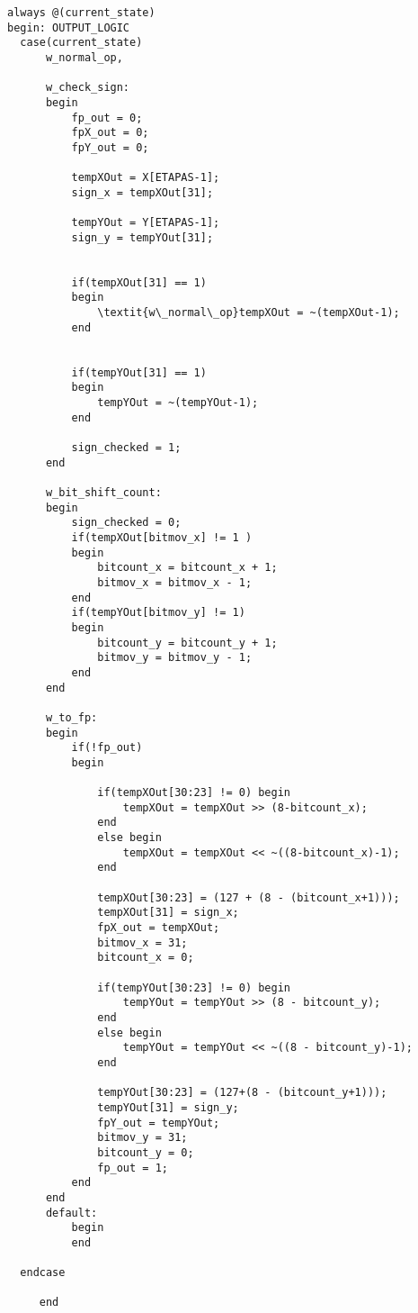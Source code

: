 \begin{lstlisting}[caption={Código de \textit{output logic} de la \gls{fsm}}]
always @(current_state)
begin: OUTPUT_LOGIC 
  case(current_state)
      w_normal_op,

      w_check_sign:
      begin
          fp_out = 0;
          fpX_out = 0;
          fpY_out = 0;

          tempXOut = X[ETAPAS-1];
          sign_x = tempXOut[31];

          tempYOut = Y[ETAPAS-1];
          sign_y = tempYOut[31];


          if(tempXOut[31] == 1)
          begin
              \textit{w\_normal\_op}tempXOut = ~(tempXOut-1);
          end


          if(tempYOut[31] == 1)
          begin
              tempYOut = ~(tempYOut-1);
          end

          sign_checked = 1;
      end

      w_bit_shift_count:
      begin
          sign_checked = 0;
          if(tempXOut[bitmov_x] != 1 )
          begin
              bitcount_x = bitcount_x + 1;
              bitmov_x = bitmov_x - 1;
          end
          if(tempYOut[bitmov_y] != 1)
          begin
              bitcount_y = bitcount_y + 1;
              bitmov_y = bitmov_y - 1;
          end
      end

      w_to_fp:
      begin
          if(!fp_out)
          begin

              if(tempXOut[30:23] != 0) begin
                  tempXOut = tempXOut >> (8-bitcount_x);
              end
              else begin
                  tempXOut = tempXOut << ~((8-bitcount_x)-1);
              end

              tempXOut[30:23] = (127 + (8 - (bitcount_x+1)));
              tempXOut[31] = sign_x;
              fpX_out = tempXOut;
              bitmov_x = 31;
              bitcount_x = 0;

              if(tempYOut[30:23] != 0) begin
                  tempYOut = tempYOut >> (8 - bitcount_y);
              end
              else begin
                  tempYOut = tempYOut << ~((8 - bitcount_y)-1);
              end

              tempYOut[30:23] = (127+(8 - (bitcount_y+1)));
              tempYOut[31] = sign_y;
              fpY_out = tempYOut;
              bitmov_y = 31;
              bitcount_y = 0;
              fp_out = 1;
          end
      end
      default:
          begin
          end

  endcase

     end

\end{lstlisting}

